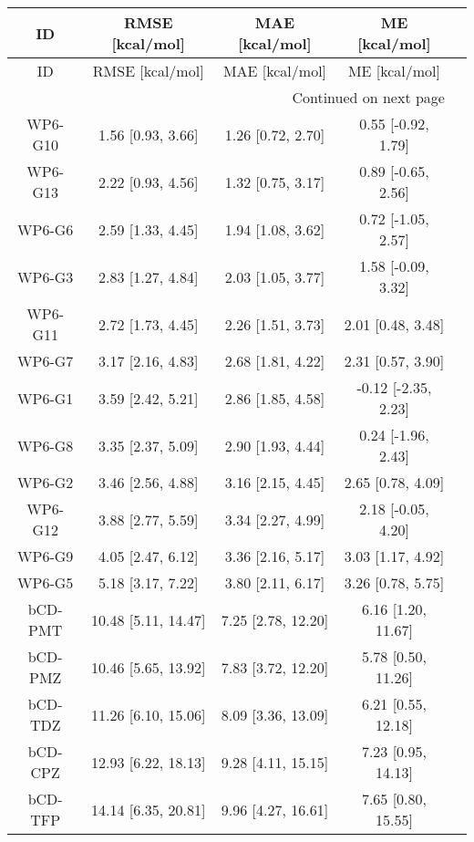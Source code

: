 \documentclass[8pt]{article}
\begin{document}
\begin{center}
\begin{footnotesize}
\begin{longtable}{|ccccc|}
\toprule
      ID &     RMSE [kcal/mol] &      MAE [kcal/mol] &       ME [kcal/mol] \\
\midrule
\endfirsthead

\toprule
      ID &     RMSE [kcal/mol] &      MAE [kcal/mol] &       ME [kcal/mol] \\
\midrule
\endhead
\midrule
\multicolumn{4}{r}{{Continued on next page}} \\
\midrule
\endfoot

\bottomrule
\endlastfoot
 WP6-G10 &   1.56 [0.93, 3.66] &   1.26 [0.72, 2.70] &  0.55 [-0.92, 1.79] \\
 WP6-G13 &   2.22 [0.93, 4.56] &   1.32 [0.75, 3.17] &  0.89 [-0.65, 2.56] \\
  WP6-G6 &   2.59 [1.33, 4.45] &   1.94 [1.08, 3.62] &  0.72 [-1.05, 2.57] \\
  WP6-G3 &   2.83 [1.27, 4.84] &   2.03 [1.05, 3.77] &  1.58 [-0.09, 3.32] \\
 WP6-G11 &   2.72 [1.73, 4.45] &   2.26 [1.51, 3.73] &   2.01 [0.48, 3.48] \\
  WP6-G7 &   3.17 [2.16, 4.83] &   2.68 [1.81, 4.22] &   2.31 [0.57, 3.90] \\
  WP6-G1 &   3.59 [2.42, 5.21] &   2.86 [1.85, 4.58] & -0.12 [-2.35, 2.23] \\
  WP6-G8 &   3.35 [2.37, 5.09] &   2.90 [1.93, 4.44] &  0.24 [-1.96, 2.43] \\
  WP6-G2 &   3.46 [2.56, 4.88] &   3.16 [2.15, 4.45] &   2.65 [0.78, 4.09] \\
 WP6-G12 &   3.88 [2.77, 5.59] &   3.34 [2.27, 4.99] &  2.18 [-0.05, 4.20] \\
  WP6-G9 &   4.05 [2.47, 6.12] &   3.36 [2.16, 5.17] &   3.03 [1.17, 4.92] \\
  WP6-G5 &   5.18 [3.17, 7.22] &   3.80 [2.11, 6.17] &   3.26 [0.78, 5.75] \\
 bCD-PMT & 10.48 [5.11, 14.47] &  7.25 [2.78, 12.20] &  6.16 [1.20, 11.67] \\
 bCD-PMZ & 10.46 [5.65, 13.92] &  7.83 [3.72, 12.20] &  5.78 [0.50, 11.26] \\
 bCD-TDZ & 11.26 [6.10, 15.06] &  8.09 [3.36, 13.09] &  6.21 [0.55, 12.18] \\
 bCD-CPZ & 12.93 [6.22, 18.13] &  9.28 [4.11, 15.15] &  7.23 [0.95, 14.13] \\
 bCD-TFP & 14.14 [6.35, 20.81] &  9.96 [4.27, 16.61] &  7.65 [0.80, 15.55] \\

\end{longtable}
\end{footnotesize}
\end{center}
\end{document}
